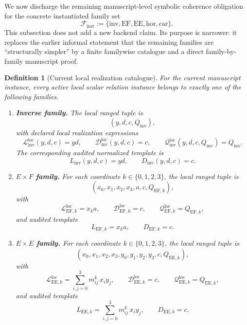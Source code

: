 ﻿\documentclass[11pt]{article}
\newtheorem{definition}[theorem]{Definition}
\begin{document}
We now discharge the remaining manuscript-level symbolic coherence obligation
for the concrete instantiated family set
\[
\mathcal F_{\mathrm{inst}}
:=
\{\mathrm{inv},\mathrm{EF},\mathrm{EE},\mathrm{hor},\mathrm{car}\}.
\]
This subsection does not add a new backend claim. Its purpose is narrower:
it replaces the earlier informal statement that the remaining families are
``structurally simpler'' by a finite familywise catalogue and a direct
family-by-family manuscript proof.

\begin{definition}[Current local realization catalogue]
\label{def:current-realization-catalogue}
For the current manuscript instance, every active local scalar relation instance
belongs to exactly one of the following families.

\begin{enumerate}[label=(\roman*),leftmargin=2em]
    \item \textbf{Inverse family.}
    The local ranged tuple is
    \[
    (y,d,c,Q_{\mathrm{inv}}),
    \]
    with declared local realization expressions
    \[
    \mathcal L^{\mathrm{loc}}_{\mathrm{inv}}(y,d,c)=yd,
    \qquad
    \mathcal D^{\mathrm{loc}}_{\mathrm{inv}}(y,d,c)=c,
    \qquad
    \mathcal Q^{\mathrm{loc}}_{\mathrm{inv}}(y,d,c,Q_{\mathrm{inv}})=Q_{\mathrm{inv}}.
    \]
    The corresponding audited normalized template is
    \[
    L_{\mathrm{inv}}(y,d,c)=yd,
    \qquad
    D_{\mathrm{inv}}(y,d,c)=c.
    \]

    \item \textbf{\(E\times F\) family.}
    For each coordinate \(k\in\{0,1,2,3\}\), the local ranged tuple is
    \[
    (x_0,x_1,x_2,x_3,a,c,Q_{\mathrm{EF},k}),
    \]
    with
    \[
    \mathcal L^{\mathrm{loc}}_{\mathrm{EF},k}=x_k a,
    \qquad
    \mathcal D^{\mathrm{loc}}_{\mathrm{EF},k}=c,
    \qquad
    \mathcal Q^{\mathrm{loc}}_{\mathrm{EF},k}=Q_{\mathrm{EF},k},
    \]
    and audited template
    \[
    L_{\mathrm{EF},k}=x_k a,
    \qquad
    D_{\mathrm{EF},k}=c.
    \]

    \item \textbf{\(E\times E\) family.}
    For each coordinate \(k\in\{0,1,2,3\}\), the local ranged tuple is
    \[
    (x_0,x_1,x_2,x_3,y_0,y_1,y_2,y_3,c,Q_{\mathrm{EE},k}),
    \]
    with
    \[
    \mathcal L^{\mathrm{loc}}_{\mathrm{EE},k}
    =
    \sum_{i,j=0}^{3} m_{ij}^k\,x_i y_j,
    \qquad
    \mathcal D^{\mathrm{loc}}_{\mathrm{EE},k}=c,
    \qquad
    \mathcal Q^{\mathrm{loc}}_{\mathrm{EE},k}=Q_{\mathrm{EE},k},
    \]
    and audited template
    \[
    L_{\mathrm{EE},k}
    =
    \sum_{i,j=0}^{3} m_{ij}^k\,x_i y_j,
    \qquad
    D_{\mathrm{EE},k}=c.
    \]


\end{enumerate}
\end{definition}
\end{document}
